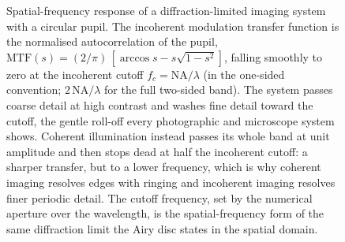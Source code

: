 \begin{figure}[htbp]
\centering
{}
\caption[Coherent and incoherent transfer functions]{Spatial-frequency
response of a diffraction-limited imaging system with a circular pupil. The
incoherent modulation transfer function is the normalised autocorrelation of
the pupil, $\mathrm{MTF}(s) = (2/\pi)\,[\arccos s - s\sqrt{1-s^2}]$, falling
smoothly to zero at the incoherent cutoff $f_c = \mathrm{NA}/\lambda$ (in the
one-sided convention; $2\,\mathrm{NA}/\lambda$ for the full two-sided band).
The system passes coarse detail at high contrast and washes fine detail toward
the cutoff, the gentle roll-off every photographic and microscope system
shows. Coherent illumination instead passes its whole band at unit amplitude
and then stops dead at half the incoherent cutoff: a sharper transfer, but to
a lower frequency, which is why coherent imaging resolves edges with ringing
and incoherent imaging resolves finer periodic detail. The cutoff frequency,
set by the numerical aperture over the wavelength, is the spatial-frequency
form of the same diffraction limit the Airy disc states in the spatial
domain.}
\label{fig:vol04ch11:mtf-cutoff}
\end{figure}

